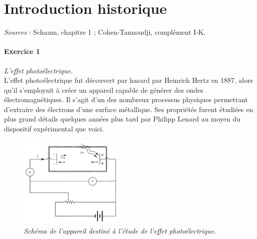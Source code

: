 \section{Introduction historique}

\textit{Sources} : Schaum, chapitre 1 ; Cohen-Tannoudji, complément I-K.

\paragraph{Exercice 1} \textit{L'effet photoélectrique.} \\
L'effet photoélectrique fut découvert par hasard par Heinrich Hertz en 1887, alors qu'il s'employait à créer un appareil capable de générer des ondes électromagnétiques. Il s'agit d'un des nombreux processus physiques permettant d'extraire des électrons d'une surface métallique. Ses propriétés furent étudiées en plus grand détails quelques années plus tard par Philipp Lenard au moyen du dispositif expérimental que voici.
 
\begin{figure}[h!]
\begin{center}
\includegraphics[width=0.45\textwidth]{Pictures/Photoelectrique.PNG}
\end{center}
\caption{\textit{Schéma de l'appareil destiné à l'étude de l'effet photoélectrique.}}
\end{figure}

